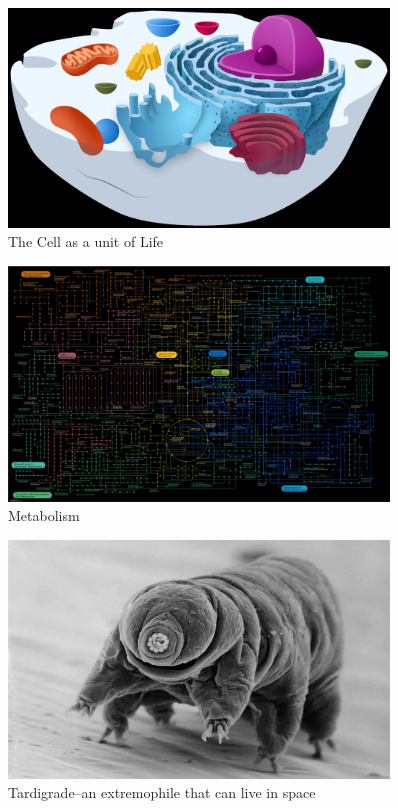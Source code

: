 \documentclass[]{article}
\begin{document}
\begin{figure}[H]
	\caption{The Cell as a unit of Life}\label{fig:cell}
	\includegraphics[width=0.9\textwidth]{Cell}
\end{figure}

\begin{figure}[H]
	\caption{Metabolism}\label{fig:metabolism}
	\includegraphics[width=0.9\textwidth]{Metabolism}
\end{figure}

\begin{figure}[H]
	\caption{Tardigrade--an extremophile that can live in space}\label{fig:tardigrade}
	\includegraphics[width=0.9\textwidth]{Tardigrade}
\end{figure}
\end{document}
